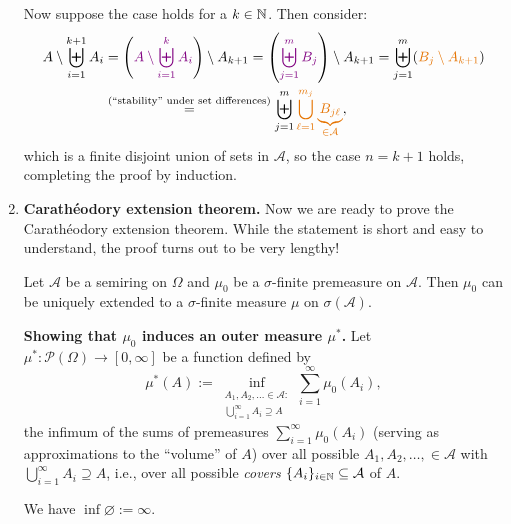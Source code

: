 \begin{enumerate}
\begin{pf}
Now suppose the case  holds for a \(k\in\mathbb{N}\). Then consider:
\begin{align*}
A\setminus \biguplus_{i=1}^{k+1}A_i
&=\left(\vc{A\setminus \biguplus_{i=1}^{k}A_i}\right)\setminus A_{k+1}
=\left(\vc{\biguplus_{j=1}^{m}B_j}\right)\setminus A_{k+1}
=\biguplus_{j=1}^{m}(\orc{B_j\setminus A_{k+1}}) \\
&\overset{\text{(``stability'' under set differences)}}{=}
\biguplus_{j=1}^{m}\orc{\bigcup_{\ell=1}^{m_j}\underbrace{B_{j\ell}}_{\in\mathcal{A}}},
\end{align*}
which is a finite disjoint union of sets in \(\mathcal{A}\), so the case
\(n=k+1\) holds, completing the proof by induction.
\end{pf}
\item \textbf{Carath\'eodory extension theorem.} Now we are ready to prove the
Carath\'eodory extension theorem. While the statement is short and easy to
understand, the proof turns out to be very lengthy!
\begin{theorem}
\label{thm:caratheodory}
Let \(\mathcal{A}\) be a semiring on \(\Omega\) and \(\mu_0\) be a
\(\sigma\)-finite premeasure on \(\mathcal{A}\). Then \(\mu_0\) can be uniquely
extended to a \(\sigma\)-finite measure \(\mu\) on \(\sigma(\mathcal{A})\).
\end{theorem}
\begin{pf}
\textbf{Showing that \(\mu_0\) induces an outer measure \(\mu^*\).}
Let \(\mu^*:\mathcal{P}(\Omega)\to[0,\infty]\) be a function defined by
\[
\mu^*(A):=\inf_{
\substack{A_1,A_2,\dotsc\in\mathcal{A}: \\
\bigcup_{i=1}^{\infty}A_i\supseteq A}}\sum_{i=1}^{\infty}\mu_0(A_i),
\]
the infimum of the sums of premeasures \(\sum_{i=1}^{\infty}\mu_0(A_i)\)
(serving as approximations to the ``volume'' of \(A\)) over all possible
\(A_1,A_2,\dotsc,\in\mathcal{A}\) with \(\bigcup_{i=1}^{\infty}A_i\supseteq
A\), i.e., over all possible \emph{covers} \(\{A_{i}\}_{i\in\mathbb{N}}\subseteq \mathcal{A}\) of \(A\).
\begin{note}
We have \(\inf\varnothing:=\infty\).
\end{note}
\begin{center}
\end{center}
\end{pf}
\end{enumerate}
